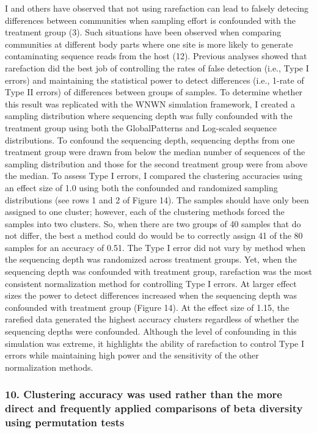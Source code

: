 \documentclass[
]{article}
\begin{document}
I and others have observed that not using rarefaction can lead to
falsely detecing differences between communities when sampling effort is
confounded with the treatment group (3). Such situations have been
observed when comparing communities at different body parts where one
site is more likely to generate contaminating sequence reads from the
host (12). Previous analyses showed that rarefaction did the best job of
controlling the rates of false detection (i.e., Type I errors) and
maintaining the statistical power to detect differences (i.e., 1-rate of
Type II errors) of differences between groups of samples. To determine
whether this result was replicated with the WNWN simulation framework, I
created a sampling distribution where sequencing depth was fully
confounded with the treatment group using both the GlobalPatterns and
Log-scaled sequence distributions. To confound the sequencing depth,
sequencing depths from one treatment group were drawn from below the
median number of sequences of the sampling distribution and those for
the second treatment group were from above the median. To assess Type I
errors, I compared the clustering accuracies using an effect size of 1.0
using both the confounded and randomized sampling distributions (see
rows 1 and 2 of Figure 14). The samples should have only been assigned
to one cluster; however, each of the clustering methods forced the
samples into two clusters. So, when there are two groups of 40 samples
that do not differ, the best a method could do would be to correctly
assign 41 of the 80 samples for an accuracy of 0.51. The Type I error
did not vary by method when the sequencing depth was randomized across
treatment groups. Yet, when the sequencing depth was confounded with
treatment group, rarefaction was the most consistent normalization
method for controlling Type I errors. At larger effect sizes the power
to detect differences increased when the sequencing depth was confounded
with treatment group (Figure 14). At the effect size of 1.15, the
rarefied data generated the highest accuracy clusters regardless of
whether the sequencing depths were confounded. Although the level of
confounding in this simulation was extreme, it highlights the ability of
rarefaction to control Type I errors while maintaining high power and
the sensitivity of the other normalization methods.

\hypertarget{clustering-accuracy-was-used-rather-than-the-more-direct-and-frequently-applied-comparisons-of-beta-diversity-using-permutation-tests}{%
\subsubsection{10. Clustering accuracy was used rather than the more
direct and frequently applied comparisons of beta diversity using
permutation
tests}\label{clustering-accuracy-was-used-rather-than-the-more-direct-and-frequently-applied-comparisons-of-beta-diversity-using-permutation-tests}}
\end{document}
